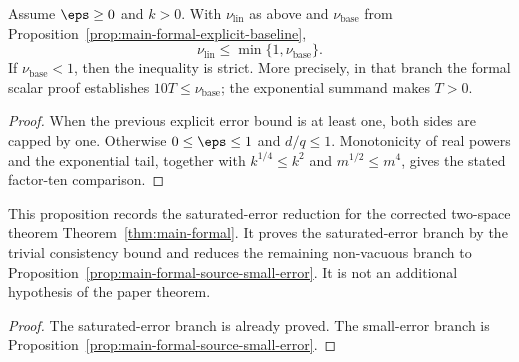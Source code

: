 \begin{proposition}
\label{prop:main-formal-linear-triangle-comparison}
	\leanok
	Assume $\eps\ge0$ and $k>0$.  With $\nu_{\mathrm{lin}}$ as above and
	$\nu_{\mathrm{base}}$ from
	Proposition~\ref{prop:main-formal-explicit-baseline},
	\[
		\nu_{\mathrm{lin}}\le\min\{1,\nu_{\mathrm{base}}\}.
	\]
	If $\nu_{\mathrm{base}}<1$, then the inequality is strict.  More precisely,
	in that branch the formal scalar proof establishes
	$10T\le\nu_{\mathrm{base}}$; the exponential summand makes $T>0$.
\end{proposition}
\begin{proof}
	\leanok
	When the previous explicit error bound is at least one, both sides are capped
	by one.  Otherwise
	$0\le\eps\le1$ and $d/q\le1$.  Monotonicity of real powers and the exponential
	tail, together with $k^{1/4}\le k^2$ and $m^{1/2}\le m^4$, gives the stated
	factor-ten comparison.
\end{proof}

\begin{proposition}\label{prop:main-formal-source-reduction}
	\leanok
	This proposition records the saturated-error reduction for the corrected
	two-space theorem
	Theorem~\ref{thm:main-formal}.  It proves the saturated-error branch by the
	trivial consistency bound and reduces the remaining non-vacuous branch to
	Proposition~\ref{prop:main-formal-source-small-error}.  It is not
	an additional hypothesis of the paper theorem.
\end{proposition}
\begin{proof}
	\leanok
	The saturated-error branch is already proved.  The small-error branch is
	Proposition~\ref{prop:main-formal-source-small-error}.
\end{proof}

